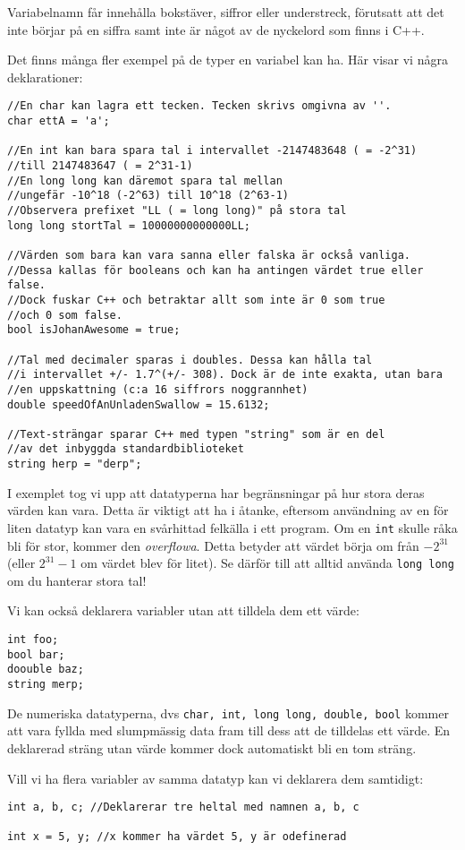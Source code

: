 Variabelnamn får innehålla bokstäver, siffror eller understreck, förutsatt att det inte börjar på en siffra samt inte är något av de nyckelord som finns i C++.

Det finns många fler exempel på de typer en variabel kan ha. Här visar vi några deklarationer:

\begin{lstlisting}
//En char kan lagra ett tecken. Tecken skrivs omgivna av ''.
char ettA = 'a';

//En int kan bara spara tal i intervallet -2147483648 ( = -2^31)
//till 2147483647 ( = 2^31-1)
//En long long kan däremot spara tal mellan 
//ungefär -10^18 (-2^63) till 10^18 (2^63-1)
//Observera prefixet "LL ( = long long)" på stora tal
long long stortTal = 10000000000000LL;

//Värden som bara kan vara sanna eller falska är också vanliga.
//Dessa kallas för booleans och kan ha antingen värdet true eller false.
//Dock fuskar C++ och betraktar allt som inte är 0 som true
//och 0 som false.
bool isJohanAwesome = true;

//Tal med decimaler sparas i doubles. Dessa kan hålla tal
//i intervallet +/- 1.7^(+/- 308). Dock är de inte exakta, utan bara
//en uppskattning (c:a 16 siffrors noggrannhet)
double speedOfAnUnladenSwallow = 15.6132;

//Text-strängar sparar C++ med typen "string" som är en del
//av det inbyggda standardbiblioteket
string herp = "derp";
\end{lstlisting}


I exemplet tog vi upp att datatyperna har begränsningar på hur stora deras värden kan vara. Detta är viktigt att ha i åtanke, eftersom användning av en för liten datatyp kan vara en svårhittad felkälla i ett program. Om en \texttt{int} skulle råka bli för stor, kommer den \emph{overflowa}. Detta betyder att värdet börja om från $-2^{31}$ (eller $2^{31}-1$ om värdet blev för litet). Se därför till att alltid använda \texttt{long long} om du hanterar stora tal!

Vi kan också deklarera variabler utan att tilldela dem ett värde: 

\begin{lstlisting}
int foo;
bool bar;
doouble baz;
string merp;
\end{lstlisting}

De numeriska datatyperna, dvs \texttt{char, int, long long, double, bool} kommer att vara fyllda med slumpmässig data fram till dess att de tilldelas ett värde. En deklarerad sträng utan värde kommer dock automatiskt bli en tom sträng.

Vill vi ha flera variabler av samma datatyp kan vi deklarera dem samtidigt:

\begin{lstlisting}
int a, b, c; //Deklarerar tre heltal med namnen a, b, c

int x = 5, y; //x kommer ha värdet 5, y är odefinerad
\end{lstlisting}